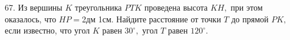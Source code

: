67. Из вершины $K$ треугольника $PTK$ проведена высота $KH,$ при этом оказалось, что $HP=$2дм 1см. Найдите расстояние от точки $T$ до прямой $PK,$ если известно, что угол $K$ равен $30^\circ,$ угол $T$ равен $120^\circ.$\\
